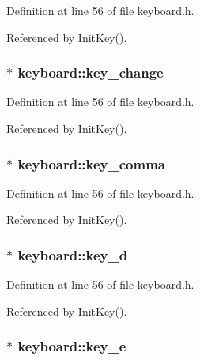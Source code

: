 Definition at line 56 of file keyboard.h.

Referenced by Init\-Key().
\subsubsection{ $\ast$ {\bf keyboard::key\_\-change}\hspace{0.3cm}{\tt  [private]}}\label{classkeyboard_keyboardr39}




Definition at line 56 of file keyboard.h.

Referenced by Init\-Key().
\subsubsection{ $\ast$ {\bf keyboard::key\_\-comma}\hspace{0.3cm}{\tt  [private]}}\label{classkeyboard_keyboardr36}




Definition at line 56 of file keyboard.h.

Referenced by Init\-Key().
\subsubsection{ $\ast$ {\bf keyboard::key\_\-d}\hspace{0.3cm}{\tt  [private]}}\label{classkeyboard_keyboardr3}




Definition at line 56 of file keyboard.h.

Referenced by Init\-Key().
\subsubsection{ $\ast$ {\bf keyboard::key\_\-e}\hspace{0.3cm}{\tt  [private]}}\label{classkeyboard_keyboardr4}




